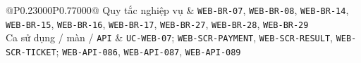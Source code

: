 \begin{longtable}{@{}P{0.23000\SRSWidth}P{0.77000\SRSWidth}@{}}
Quy tắc nghiệp vụ & \texttt{WEB-\allowbreak{}BR-\allowbreak{}07}, \texttt{WEB-\allowbreak{}BR-\allowbreak{}08}, \texttt{WEB-\allowbreak{}BR-\allowbreak{}14}, \texttt{WEB-\allowbreak{}BR-\allowbreak{}15}, \texttt{WEB-\allowbreak{}BR-\allowbreak{}16}, \texttt{WEB-\allowbreak{}BR-\allowbreak{}17}, \texttt{WEB-\allowbreak{}BR-\allowbreak{}27}, \texttt{WEB-\allowbreak{}BR-\allowbreak{}28}, \texttt{WEB-\allowbreak{}BR-\allowbreak{}29} \\[3pt]
Ca sử dụng /\allowbreak{} màn /\allowbreak{} \texttt{API} & \texttt{UC-\allowbreak{}WEB-\allowbreak{}07}; \texttt{WEB-\allowbreak{}SCR-\allowbreak{}PAYMENT}, \texttt{WEB-\allowbreak{}SCR-\allowbreak{}RESULT}, \texttt{WEB-\allowbreak{}SCR-\allowbreak{}TICKET}; \texttt{WEB-\allowbreak{}API-\allowbreak{}086}, \texttt{WEB-\allowbreak{}API-\allowbreak{}087}, \texttt{WEB-\allowbreak{}API-\allowbreak{}089} \\[3pt]
\end{longtable}
\endgroup

